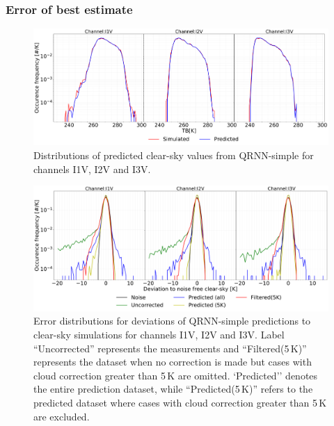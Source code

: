 \documentclass[amt, manuscript]{copernicus}
\begin{document}
\subsubsection{Error of best estimate}
%
\begin{figure}[t]
	\includegraphics[width=\textwidth]{Figures/PDF_predictions_ICI.pdf} 
	\caption{Distributions of predicted clear-sky values from QRNN-simple for channels I1V, I2V and I3V. }
	\label{fig:PDF_predictions}	
\end{figure}
\begin{figure}[t ]
	\includegraphics[width=\textwidth]{Figures/error_distribution_QRNN-single.pdf} 
	\caption{Error distributions for deviations of QRNN-simple predictions to clear-sky simulations for channels I1V, I2V and I3V. Label ``Uncorrected'' represents the measurements and ``Filtered(5\,K)'' represents the dataset when no correction is made but cases with cloud correction greater than 5\,K are omitted. `Predicted'' denotes the entire prediction dataset, while ``Predicted(5\,K)'' refers to the predicted dataset where cases with cloud correction greater than 5\,K are excluded.}
	\label{fig:error_distributions}	
\end{figure}
\end{document}
